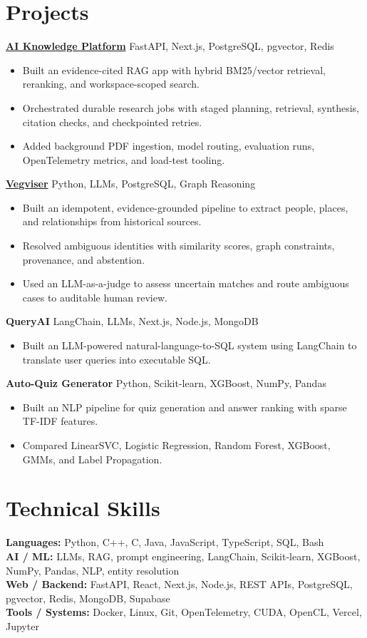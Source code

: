 \documentclass[10pt,a4paper]{article}
\begin{document}
\section*{Projects}
\href{https://github.com/ataraxiiaa/ai-knowledge-platform}{\textbf{AI Knowledge Platform}} \hfill FastAPI, Next.js, PostgreSQL, pgvector, Redis
\begin{itemize}
\item Built an evidence-cited RAG app with hybrid BM25/vector retrieval, reranking, and workspace-scoped search.
\item Orchestrated durable research jobs with staged planning, retrieval, synthesis, citation checks, and checkpointed retries.
\item Added background PDF ingestion, model routing, evaluation runs, OpenTelemetry metrics, and load-test tooling.
\end{itemize}

\href{https://vegviser.vercel.app/}{\textbf{Vegviser}} \hfill Python, LLMs, PostgreSQL, Graph Reasoning
\begin{itemize}
\item Built an idempotent, evidence-grounded pipeline to extract people, places, and relationships from historical sources.
\item Resolved ambiguous identities with similarity scores, graph constraints, provenance, and abstention.
\item Used an LLM-as-a-judge to assess uncertain matches and route ambiguous cases to auditable human review.
\end{itemize}

\textbf{QueryAI} \hfill LangChain, LLMs, Next.js, Node.js, MongoDB
\begin{itemize}
\item Built an LLM-powered natural-language-to-SQL system using LangChain to translate user queries into executable SQL.
\end{itemize}

\textbf{Auto-Quiz Generator} \hfill Python, Scikit-learn, XGBoost, NumPy, Pandas
\begin{itemize}
\item Built an NLP pipeline for quiz generation and answer ranking with sparse TF-IDF features.
\item Compared LinearSVC, Logistic Regression, Random Forest, XGBoost, GMMs, and Label Propagation.
\end{itemize}

\section*{Technical Skills}
\textbf{Languages:} Python, C++, C, Java, JavaScript, TypeScript, SQL, Bash\\
\textbf{AI / ML:} LLMs, RAG, prompt engineering, LangChain, Scikit-learn, XGBoost, NumPy, Pandas, NLP, entity resolution\\
\textbf{Web / Backend:} FastAPI, React, Next.js, Node.js, REST APIs, PostgreSQL, pgvector, Redis, MongoDB, Supabase\\
\textbf{Tools / Systems:} Docker, Linux, Git, OpenTelemetry, CUDA, OpenCL, Vercel, Jupyter
\end{document}
